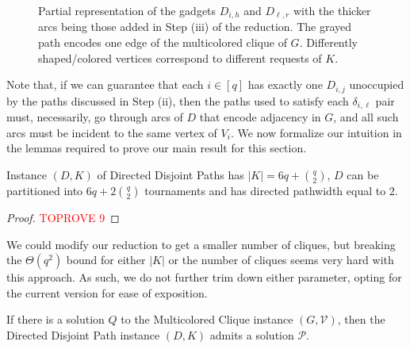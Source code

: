 \documentclass[a4paper,UKenglish,cleveref, autoref, thm-restate]{lipics-v2021}
\newcommand{\pname}[1]{{\sc #1}}
\begin{document}
\begin{enumerate}[(i)]
\begin{figure}[!htb]
      \caption{Partial representation of the gadgets $D_{i,h}$ and $D_{\ell, r}$ with the thicker
        arcs being those added in Step (iii) of the reduction. The grayed path encodes one
        edge of the multicolored clique of $G$. Differently shaped/colored vertices
      correspond to different requests of $K$.\label{fig:slivkins_s3}}
    \end{figure}
    \end{enumerate}
    Note that, if we can guarantee that each $i \in [q]$ has exactly one $D_{i,j}$
    unoccupied by the paths discussed in Step (ii), then the paths used to satisfy each
    $\delta_{i, \ell}$ pair must, necessarily, go through arcs of $D$ that encode
    adjacency in $G$, and all such arcs must be incident to the same vertex of $V_i$.
    We now formalize our intuition in the lemmas required to prove our main result for this section.

    \begin{observation}
      \label{obs:slivkins_structure}
      Instance $(D, K)$ of \pname{Directed Disjoint Paths} has $|K| = 6q + \binom{q}{2}$,
      $D$ can be partitioned into $6q + 2\binom{q}{2}$ tournaments and has directed
      pathwidth equal to 2.
    \end{observation}

    \begin{proof}\textcolor{red}{TOPROVE 9}\end{proof}

    We could modify our reduction to get a smaller number of cliques, but breaking the
    $\Theta(q^2)$ bound for either $|K|$ or the number of cliques seems very hard with
    this approach.
    As such, we do not further trim down either parameter, opting for the current version
    for ease of exposition.

    \begin{lemma}
      \label{lem:slivkins_forward}
      If there is a solution $Q$ to the \pname{Multicolored Clique} instance $(G,
      \mathcal{V})$, then the \pname{Directed Disjoint Path} instance $(D, K)$ admits a
      solution $\mathcal{P}$.
    \end{lemma}
\end{document}

